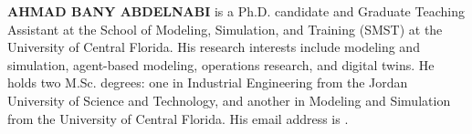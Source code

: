 \documentclass{scspaperproc}
\theoremstyle{scsthe}
\begin{document}
    \textbf{\uppercase{Ahmad Bany Abdelnabi}} is a Ph.D. candidate and Graduate Teaching Assistant at the School of Modeling, Simulation, and Training (SMST) at the University of Central Florida. His research interests include modeling and simulation, agent-based modeling, operations research, and digital twins. He holds two M.Sc. degrees: one in Industrial Engineering from the Jordan University of Science and Technology, and another in Modeling and Simulation from the University of Central Florida. His email address is .
\end{document}
